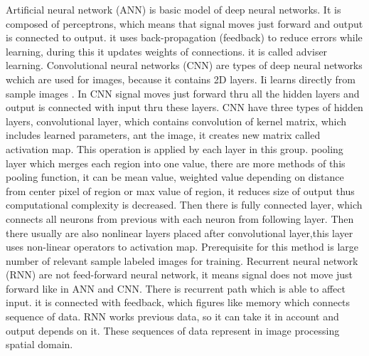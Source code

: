        Artificial neural network (ANN) is basic model of deep neural networks. It is composed of perceptrons, which means that signal moves just forward and output is connected to output.
        it uses back-propagation (feedback) to reduce errors while learning, during this it updates weights of connections. it is called adviser learning. \cite{30}
        Convolutional neural networks (CNN) are types of deep neural networks wchich are used for images, because it contains 2D layers. Ii learns directly from sample images \cite{2}.
        In CNN signal moves just forward thru all the hidden layers and output is connected with input thru these layers.
        CNN have three types of hidden layers, convolutional layer, which contains convolution of kernel matrix, which includes learned parameters, ant the image, it creates new matrix
        called activation map. This operation is applied by each layer in this group. pooling layer which merges each region into one value, there are more methods of this pooling function,
        it can be mean value, weighted value depending on distance from center pixel of region or max value of region, it reduces size of output thus computational complexity is decreased.
        Then there is fully connected layer, which connects all neurons from previous with each neuron from following layer. Then there usually are also nonlinear layers placed
        after convolutional layer,this layer uses non-linear operators to activation map. Prerequisite for this method is large number of relevant sample labeled images for training. \cite{30, 31}
        Recurrent neural network (RNN) are not feed-forward neural network, it means signal does not move just forward like in ANN and CNN. There is recurrent path which is able to affect input.
        it is connected with feedback, which figures like memory which connects sequence of data. RNN works previous data, so it can take it in account and output depends on it.
        These sequences of data represent in image processing spatial domain. \cite{30}